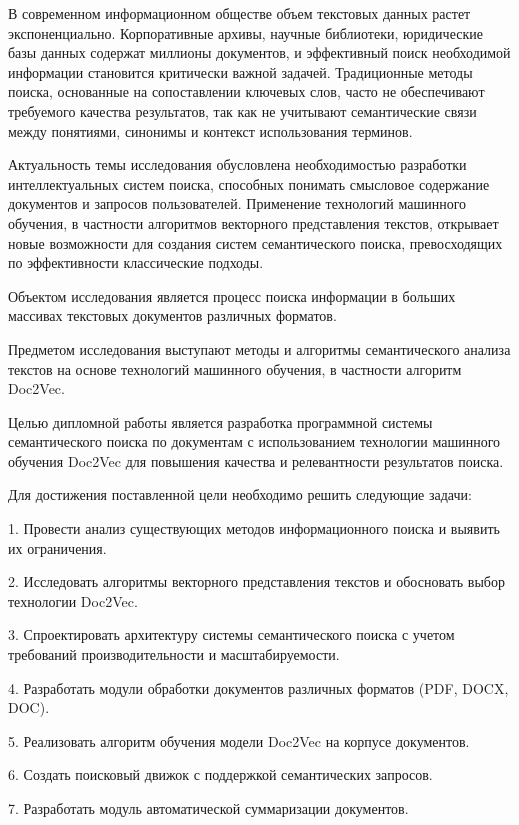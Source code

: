 
	
	В современном информационном обществе объем текстовых данных растет экспоненциально. Корпоративные архивы, научные библиотеки, юридические базы данных содержат миллионы документов, и эффективный поиск необходимой информации становится критически важной задачей. Традиционные методы поиска, основанные на сопоставлении ключевых слов, часто не обеспечивают требуемого качества результатов, так как не учитывают семантические связи между понятиями, синонимы и контекст использования терминов.
	
	Актуальность темы исследования обусловлена необходимостью разработки интеллектуальных систем поиска, способных понимать смысловое содержание документов и запросов пользователей. Применение технологий машинного обучения, в частности алгоритмов векторного представления текстов, открывает новые возможности для создания систем семантического поиска, превосходящих по эффективности классические подходы.
	
	Объектом исследования является процесс поиска информации в больших массивах текстовых документов различных форматов.
	
	Предметом исследования выступают методы и алгоритмы семантического анализа текстов на основе технологий машинного обучения, в частности алгоритм Doc2Vec.
	
	Целью дипломной работы является разработка программной системы семантического поиска по документам с использованием технологии машинного обучения Doc2Vec для повышения качества и релевантности результатов поиска.
	
	Для достижения поставленной цели необходимо решить следующие задачи:
	
	1. Провести анализ существующих методов информационного поиска и выявить их ограничения.
	
	2. Исследовать алгоритмы векторного представления текстов и обосновать выбор технологии Doc2Vec.
	
	3. Спроектировать архитектуру системы семантического поиска с учетом требований производительности и масштабируемости.
	
	4. Разработать модули обработки документов различных форматов (PDF, DOCX, DOC).
	
	5. Реализовать алгоритм обучения модели Doc2Vec на корпусе документов.
	
	6. Создать поисковый движок с поддержкой семантических запросов.
	
	7. Разработать модуль автоматической суммаризации документов.
	
